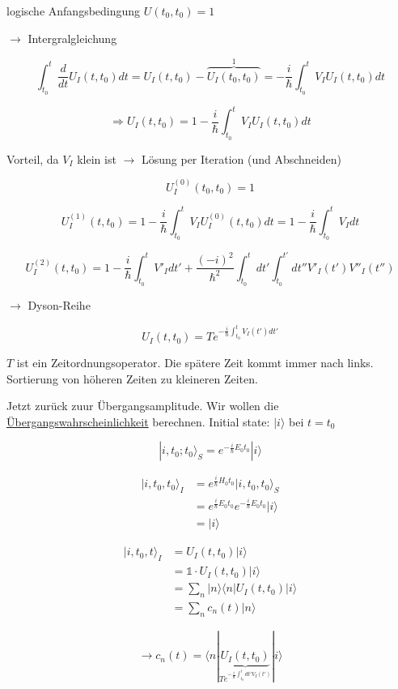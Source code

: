 logische Anfangsbedingung \(U(t_0,t_0)=1\)

\(\rightarrow\) Intergralgleichung

\[ \int_{t_0}^{t}\frac{d}{dt} U_I(t,t_0) dt = U_I(t,t_0) -\overbrace{U_I(t_0,t_0) }^{1} = -\frac{i}{\hbar}\int_{t_0}^{t}V_IU_I(t,t_0)dt\]


\[\Rightarrow U_I(t,t_0) = 1 - \frac{i}{\hbar} \int_{t_0}^{t}V_IU_I(t,t_0)dt\]


Vorteil, da \(V_I\) klein ist \(\rightarrow\) Lösung per Iteration (und Abschneiden)



\[U_I^{(0)}(t_0,t_0)=1\]

\[U_I^{(1)}(t,t_0)=1 - \frac{i}{\hbar} \int_{t_0}^{t}V_IU_I^{(0)}(t,t_0)dt = 1 - \frac{i}{\hbar} \int_{t_0}^{t}V_Idt\]

\[ U_I^{(2)}(t,t_0)=1 - \frac{i}{\hbar} \int_{t_0}^{t}V'_Idt' + \frac{(-i)^2}{\hbar^2}\int_{t_0}^{t}dt'\int_{t_0}^{t'}dt''V'_I(t')V''_I(t'') \]

\(\rightarrow\) Dyson-Reihe
  
\[\boxed{U_I(t,t_0)=T e^{-\frac{i}{\hbar}\int_{t_0}^{t}V_I(t')dt'}}\]

\(T\) ist ein Zeitordnungsoperator. Die spätere Zeit kommt immer nach links. Sortierung von höheren Zeiten zu kleineren Zeiten.

Jetzt zurück zuur Übergangsamplitude. Wir wollen die \underline{Übergangswahrscheinlichkeit} berechnen. Initial state: \(|i\rangle\) bei \(t=t_0\)

 
\[|i,t_0;t_0\rangle_S = e^{-\frac{i}{\hbar}E_0 t_0}|i\rangle\]

\begin{align} 
|i,t_0,t_0\rangle_I &= e^{\frac{i}{\hbar}H_0 t_0}|i,t_0,t_0\rangle_S\\
&= e^{\frac{i}{\hbar}E_0 t_0}e^{-\frac{i}{\hbar}E_0 t_0}|i\rangle \\
&= |i\rangle
\end{align}


\begin{align}
|i,t_0,t\rangle_I &= U_I(t,t_0)|i\rangle \\
&=\mathbb 1\cdot U_I(t,t_0)|i\rangle \\
&=\sum_n |n\rangle \langle n| U_I(t,t_0)|i\rangle \\
&= \sum_n c_n(t) |n\rangle
\end{align}

\[\rightarrow c_n(t) = \langle n|\underbrace{U_I(t,t_0)}_{Te^{-\frac{i}{\hbar}\int_{t_0}^tdt'V_I(t')}}|i\rangle\]

